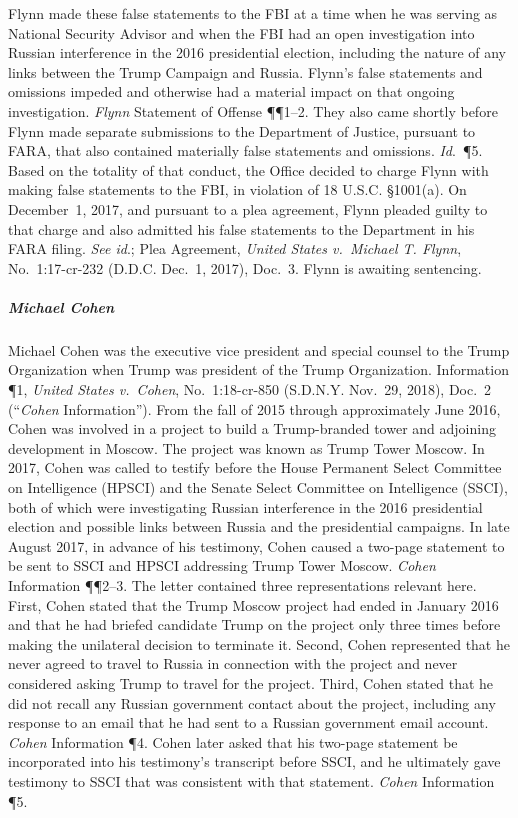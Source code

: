 Flynn made these false statements to the FBI at a time when he was serving as National Security Advisor and when the FBI had an open investigation into Russian interference in the 2016 presidential election, including the nature of any links between the Trump Campaign and Russia.
Flynn's false statements and omissions impeded and otherwise had a material impact on that ongoing investigation.
\textit{Flynn} Statement of Offense \P\P 1--2.
They also came shortly before Flynn made separate submissions to the Department of Justice, pursuant to FARA, that also contained materially false statements and omissions.
\textit{Id}.~\P 5.
Based on the totality of that conduct, the Office decided to charge Flynn with making false statements to the FBI, in violation of 18 U.S.C. \S 1001(a).
On December~1, 2017, and pursuant to a plea agreement, Flynn pleaded guilty to that charge and also admitted his false statements to the Department in his FARA filing.
\textit{See id}.; Plea Agreement, \textit{United States v.\ Michael T. Flynn}, No.~1:17-cr-232 (D.D.C. Dec.~1, 2017), Doc.~3.
Flynn is awaiting sentencing.

\subparagraph{Michael Cohen}
Michael Cohen was the executive vice president and special counsel to the Trump Organization when Trump was president of the Trump Organization.
Information \P 1, \textit{United States v.\ Cohen}, No.~1:18-cr-850 (S.D.N.Y. Nov.~29, 2018), Doc.~2 (``\textit{Cohen} Information'').
From the fall of 2015 through approximately June 2016, Cohen was involved in a project to build a Trump-branded tower and adjoining development in Moscow.
The project was known as Trump Tower Moscow.
In 2017, Cohen was called to testify before the House Permanent Select Committee on Intelligence (HPSCI) and the Senate Select Committee on Intelligence (SSCI), both of which were investigating Russian interference in the 2016 presidential election and possible links between Russia and the presidential campaigns.
In late August 2017, in advance of his testimony, Cohen caused a two-page statement to be sent to SSCI and HPSCI addressing Trump Tower Moscow.
\textit{Cohen} Information \P\P 2--3.
The letter contained three representations relevant here.
First, Cohen stated that the Trump Moscow project had ended in January 2016 and that he had briefed candidate Trump on the project only three times before making the unilateral decision to terminate it.
Second, Cohen represented that he never agreed to travel to Russia in connection with the project and never considered asking Trump to travel for the project.
Third, Cohen stated that he did not recall any Russian government contact about the project, including any response to an email that he had sent to a Russian government email account.
\textit{Cohen} Information \P 4.
Cohen later asked that his two-page statement be incorporated into his testimony's transcript before SSCI, and he ultimately gave testimony to SSCI that was consistent with that statement.
\textit{Cohen} Information \P 5.


